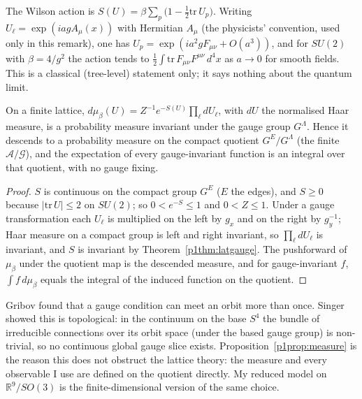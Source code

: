 \begin{remark}
 The Wilson action is $S(U)=\beta\sum_p\bigl(1-\tfrac12\mathrm{tr}\,U_p\bigr)$.
Writing $U_\ell=\exp(iagA_\mu(x))$ with Hermitian $A_\mu$ (the physicists' convention, used only in this remark), one has $U_p=\exp(ia^2gF_{\mu\nu}+O(a^3))$, and for $SU(2)$
with $\beta=4/g^2$ the action tends to $\tfrac12\int\mathrm{tr}\,F_{\mu\nu}F^{\mu\nu}\,d^4x$ as $a\to0$ for smooth
fields. This is a classical (tree-level) statement only; it says nothing about the quantum limit.
\end{remark}

\begin{proposition}\label{p1prop:measure}
 On a finite lattice, $d\mu_\beta(U)=Z^{-1}e^{-S(U)}\prod_\ell dU_\ell$, with $dU$ the normalised
Haar measure, is a probability measure invariant under the gauge group $G^\Lambda$. Hence it descends to
a probability measure on the compact quotient $G^{E}/G^{\Lambda}$ (the finite $\mathcal{A}/\mathcal{G}$), and the
expectation of every gauge-invariant function is an integral over that quotient, with no gauge fixing.
\end{proposition}
\begin{proof}
$S$ is continuous on the compact group $G^E$ ($E$ the edges), and $S\ge0$ because $|\mathrm{tr}\,U|\le2$ on $SU(2)$; so $0<e^{-S}\le1$ and $0<Z\le1$. Under a gauge
transformation each $U_\ell$ is multiplied on the left by $g_x$ and on the right by $g_y^{-1}$; Haar measure on a
compact group is left and right invariant, so $\prod_\ell dU_\ell$ is invariant, and $S$ is invariant by
Theorem~\ref{p1thm:latgauge}. The pushforward of $\mu_\beta$ under the quotient map is the descended measure, and for
gauge-invariant $f$, $\int f\,d\mu_\beta$ equals the integral of the induced function on the quotient.
\end{proof}

\begin{remark}
Gribov found that a gauge condition can meet an orbit more than once. Singer showed this is topological: in the
continuum on the base $S^4$ the bundle of irreducible connections over its
orbit space (under the based gauge group) is non-trivial, so no continuous global gauge slice exists. Proposition~\ref{p1prop:measure} is the reason
this does not obstruct the lattice theory: the measure and every observable I use are defined on the quotient
directly. My reduced model on $\mathbb{R}^9/SO(3)$ is the finite-dimensional version of the same choice.
\end{remark}


